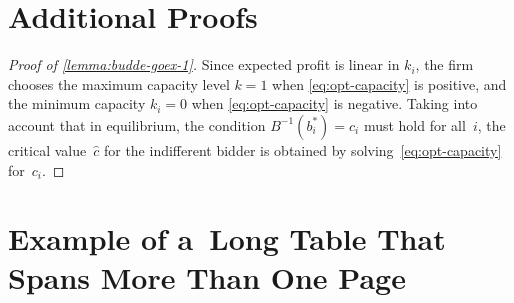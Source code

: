 \documentclass[11pt, a4paper, oneside]{article}
\newlength{\baselinedist}
\theoremstyle{Plain}
\theoremstyle{Definition}
\theoremstyle{Remark}
\begin{document}
\begin{appendix}

\section{Additional Proofs}
\label{app:proofs}

\begin{proof}[Proof of \autoref{lemma:budde-goex-1}]
	Since expected profit is linear in $k_i$, the firm chooses the maximum capacity level ${k = 1}$ when \eqref{eq:opt-capacity} is positive, and the minimum capacity ${k_i = 0}$ when \eqref{eq:opt-capacity} is negative. Taking into account that in equilibrium, the condition ${B^{-1}(b_i^*) = c_i}$ must hold for all~$i$, the critical value~$\hat{c}$ for the indifferent bidder is obtained by solving~\eqref{eq:opt-capacity} for~$c_i$.
\end{proof}

\clearpage

\raggedbottom

\section{Example of a~Long Table That Spans More Than One Page}

\newcommand{\pz}{\phantom{0}}
\def\tablecapstrut{\vrule height\baselinedist depth1ex width0pt}

\begingroup


\end{appendix}
\end{document}
